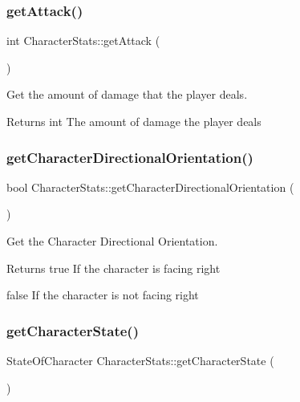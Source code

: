 \subsubsection{\texorpdfstring{getAttack()}{getAttack()}}
{\footnotesize\ttfamily int Character\+Stats\+::get\+Attack (\begin{DoxyParamCaption}{ }\end{DoxyParamCaption})\hspace{0.3cm}{\ttfamily [inline]}}



Get the amount of damage that the player deals. 

\begin{DoxyReturn}{Returns}
int The amount of damage the player deals 
\end{DoxyReturn}
\mbox{\label{classCharacterStats_ad5fedea8c417b2ddcb6b72c8ce6a06ac}} 
\subsubsection{\texorpdfstring{getCharacterDirectionalOrientation()}{getCharacterDirectionalOrientation()}}
{\footnotesize\ttfamily bool Character\+Stats\+::get\+Character\+Directional\+Orientation (\begin{DoxyParamCaption}{ }\end{DoxyParamCaption})\hspace{0.3cm}{\ttfamily [inline]}}



Get the Character Directional Orientation. 

\begin{DoxyReturn}{Returns}
true If the character is facing right 

false If the character is not facing right 
\end{DoxyReturn}
\mbox{\label{classCharacterStats_aaae019fd87e05cc2f98b440a868dcf41}} 
\subsubsection{\texorpdfstring{getCharacterState()}{getCharacterState()}}
{\footnotesize\ttfamily State\+Of\+Character Character\+Stats\+::get\+Character\+State (\begin{DoxyParamCaption}{ }\end{DoxyParamCaption})\hspace{0.3cm}{\ttfamily [inline]}}



